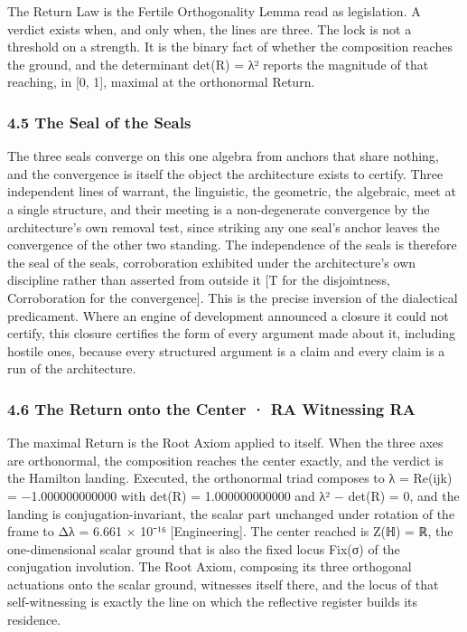 \documentclass[10pt,twocolumn]{article}
\begin{document}
The Return Law is the Fertile Orthogonality Lemma read as legislation. A
verdict exists when, and only when, the lines are three. The lock is not
a threshold on a strength. It is the binary fact of whether the
composition reaches the ground, and the determinant det(R) = λ² reports
the magnitude of that reaching, in {[}0, 1{]}, maximal at the
orthonormal Return.

\hypertarget{the-seal-of-the-seals}{%
\subsubsection{4.5 The Seal of the Seals}\label{the-seal-of-the-seals}}

The three seals converge on this one algebra from anchors that share
nothing, and the convergence is itself the object the architecture
exists to certify. Three independent lines of warrant, the linguistic,
the geometric, the algebraic, meet at a single structure, and their
meeting is a non-degenerate convergence by the architecture's own
removal test, since striking any one seal's anchor leaves the
convergence of the other two standing. The independence of the seals is
therefore the seal of the seals, corroboration exhibited under the
architecture's own discipline rather than asserted from outside it {[}T
for the disjointness, Corroboration for the convergence{]}. This is the
precise inversion of the dialectical predicament. Where an engine of
development announced a closure it could not certify, this closure
certifies the form of every argument made about it, including hostile
ones, because every structured argument is a claim and every claim is a
run of the architecture.

\hypertarget{the-return-onto-the-center-ra-witnessing-ra}{%
\subsubsection{4.6 The Return onto the Center · RA Witnessing
RA}\label{the-return-onto-the-center-ra-witnessing-ra}}

The maximal Return is the Root Axiom applied to itself. When the three
axes are orthonormal, the composition reaches the center exactly, and
the verdict is the Hamilton landing. Executed, the orthonormal triad
composes to λ = Re(ijk) = −1.000000000000 with det(R) = 1.000000000000
and \textbar λ² − det(R)\textbar{} = 0, and the landing is
conjugation-invariant, the scalar part unchanged under rotation of the
frame to \textbar Δλ\textbar{} = 6.661 × 10⁻¹⁶ {[}Engineering{]}. The
center reached is Z(ℍ) = ℝ, the one-dimensional scalar ground that is
also the fixed locus Fix(σ) of the conjugation involution. The Root
Axiom, composing its three orthogonal actuations onto the scalar ground,
witnesses itself there, and the locus of that self-witnessing is exactly
the line on which the reflective register builds its residence.
\end{document}
